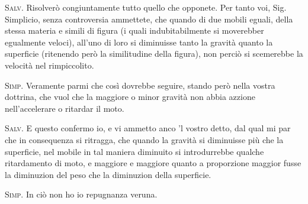 \documentclass[11pt,twoside,openany]{book}
\newcommand{\speaker}[1]{\textcolor{rubric}{\textsc{#1}}\space}
\begin{document}
\speaker{Salv.} Risolverò congiuntamente tutto quello che opponete. Per tanto voi, Sig. Simplicio, senza controversia ammettete, che quando di due mobili eguali, della stessa materia e simili di figura (i quali indubitabilmente si moverebber egualmente veloci), all'uno di loro si diminuisse tanto la gravità quanto la superficie (ritenendo però la similitudine della figura), non perciò si scemerebbe la velocità nel rimpiccolito.

\speaker{Simp.} Veramente parmi che così dovrebbe seguire, stando però nella vostra dottrina, che vuol che la maggiore o minor gravità non abbia azzione nell'accelerare o ritardar il moto.

\speaker{Salv.} E questo confermo io, e vi ammetto anco 'l vostro detto, dal qual mi par che in consequenza si ritragga, che quando la gravità si diminuisse più che la superficie, nel mobile in tal maniera diminuito si introdurrebbe qualche ritardamento di moto, e maggiore e maggiore quanto a proporzione maggior fusse la diminuzion del peso che la diminuzion della superficie.

\speaker{Simp.} In ciò non ho io repugnanza veruna.
\end{document}
